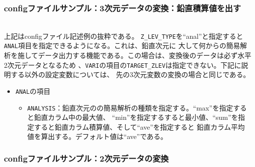 \subsubsection{configファイルサンプル：3次元データの変換：鉛直積算値を出す}

\\

\noindent 上記はconfigファイル記述例の抜粋である。
\verb|Z_LEV_TYPE|を``anal''と指定すると\verb|ANAL|項目を指定できるようになる。これは、鉛直次元に
大して何からの簡易解析を施してデータ出力する機能である。この場合は、変換後のデータは必ず水平2次元データとなるため
、\verb|VARI|の項目の\verb|TARGET_ZLEV|は指定できない。下記に説明する以外の設定変数については、
先の3次元変数の変換の場合と同じである。
\begin{itemize}
 \item \verb|ANAL|の項目
 \begin{itemize}
  \item \verb|ANALYSIS|：鉛直次元のの簡易解析の種類を指定する。``max''を指定すると鉛直カラム中の最大値、
        ``min''を指定するすると最小値、``sum''を指定すると鉛直カラム積算値、そして``ave''を指定すると
        鉛直カラム平均値を算出する。デフォルト値は``ave''である。
 \end{itemize}
\end{itemize}


\subsubsection{configファイルサンプル：2次元データの変換}

